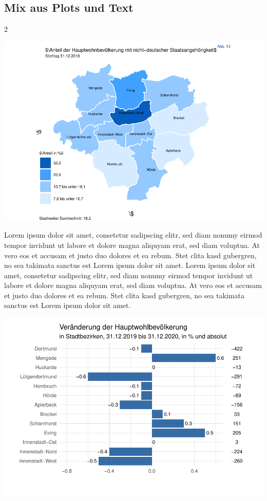 \documentclass[
  a4paper,
  twoside]{article}
\begin{document}
\newpage

\hypertarget{mix-aus-plots-und-text}{%
\subsection{Mix aus Plots und Text}\label{mix-aus-plots-und-text}}

\begin {multicols}{2}

\begin{flushright}\includegraphics[width=1\linewidth]{2021-03-02_Beispiel_files/figure-latex/Plot map-1} \end{flushright}

Lorem ipsum dolor sit amet, consetetur sadipscing elitr, sed diam nonumy
eirmod tempor invidunt ut labore et dolore magna aliquyam erat, sed diam
voluptua. At vero eos et accusam et justo duo dolores et ea rebum. Stet
clita kasd gubergren, no sea takimata sanctus est Lorem ipsum dolor sit
amet. Lorem ipsum dolor sit amet, consetetur sadipscing elitr, sed diam
nonumy eirmod tempor invidunt ut labore et dolore magna aliquyam erat,
sed diam voluptua. At vero eos et accusam et justo duo dolores et ea
rebum. Stet clita kasd gubergren, no sea takimata sanctus est Lorem
ipsum dolor sit amet.

\includegraphics[width=1\linewidth]{2021-03-02_Beispiel_files/figure-latex/unnamed-chunk-1-1}


\end{multicols}
\end{document}
